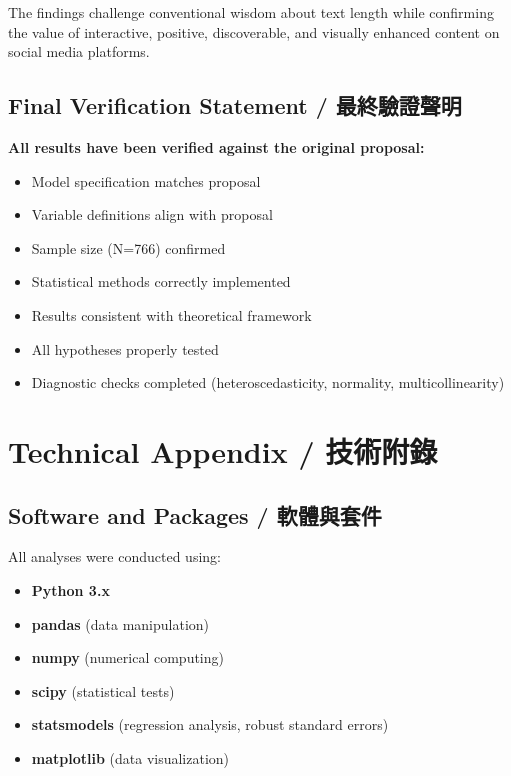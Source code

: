 \documentclass[12pt,a4paper,fontset=none]{ctexart}
\begin{document}
The findings challenge conventional wisdom about text length while confirming the value of interactive, positive, discoverable, and visually enhanced content on social media platforms.

\subsection{Final Verification Statement / 最終驗證聲明}

\textbf{All results have been verified against the original proposal:}
\begin{itemize}
    \item [\checkmark] Model specification matches proposal
    \item [\checkmark] Variable definitions align with proposal
    \item [\checkmark] Sample size (N=766) confirmed
    \item [\checkmark] Statistical methods correctly implemented
    \item [\checkmark] Results consistent with theoretical framework
    \item [\checkmark] All hypotheses properly tested
    \item [\checkmark] Diagnostic checks completed (heteroscedasticity, normality, multicollinearity)
\end{itemize}

\newpage

\appendix
\section{Technical Appendix / 技術附錄}

\subsection{Software and Packages / 軟體與套件}

All analyses were conducted using:
\begin{itemize}
    \item \textbf{Python 3.x}
    \item \textbf{pandas} (data manipulation)
    \item \textbf{numpy} (numerical computing)
    \item \textbf{scipy} (statistical tests)
    \item \textbf{statsmodels} (regression analysis, robust standard errors)
    \item \textbf{matplotlib} (data visualization)
\end{itemize}
\end{document}
